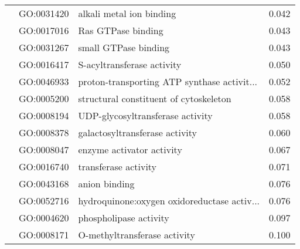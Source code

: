 \begin{longtable}{lllr}
   & GO:0031420 &                     alkali metal ion binding &         0.042 \\
   & GO:0017016 &                           Ras GTPase binding &         0.043 \\
   & GO:0031267 &                         small GTPase binding &         0.043 \\
   & GO:0016417 &                   S-acyltransferase activity &         0.050 \\
   & GO:0046933 &  proton-transporting ATP synthase activit... &         0.052 \\
   & GO:0005200 &       structural constituent of cytoskeleton &         0.058 \\
   & GO:0008194 &             UDP-glycosyltransferase activity &         0.058 \\
   & GO:0008378 &               galactosyltransferase activity &         0.060 \\
   & GO:0008047 &                    enzyme activator activity &         0.067 \\
   & GO:0016740 &                         transferase activity &         0.071 \\
   & GO:0043168 &                                anion binding &         0.076 \\
   & GO:0052716 &  hydroquinone:oxygen oxidoreductase activ... &         0.076 \\
   & GO:0004620 &                       phospholipase activity &         0.097 \\
   & GO:0008171 &                 O-methyltransferase activity &         0.100 \\
\end{longtable}
